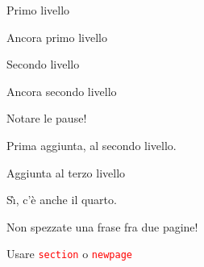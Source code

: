 \documentclass[italian,landscape]{report}
\newcommand{\rosso}[1]{\textcolor{red}{#1}}
\begin{document}
\begin{firstheadlineitemize}

\item Primo livello

\pause

\item Ancora primo livello

\pause

\begin{secondheadlineitemize}

\item Secondo livello

\pause

\item Ancora secondo livello

\end{secondheadlineitemize}

\pause

\item Notare le pause!

\pause

\begin{secondheadlineitemize}

\item Prima aggiunta, al secondo livello.

\pause

\begin{thirdheadlineitemize}

\item Aggiunta al terzo livello

\pause

\begin{fourthheadlineitemize}

\item S\`{\i}, c'\`{e} anche il quarto.

\pause

\end{fourthheadlineitemize}

\end{thirdheadlineitemize}

\end{secondheadlineitemize}

\item Non spezzate una frase fra due pagine!

\pause

\begin{secondheadlineitemize}

\item Usare \rosso{\texttt{section}} o \rosso{\texttt{\symbol{92}newpage}}

\end{secondheadlineitemize}

\end{firstheadlineitemize}
\end{document}
